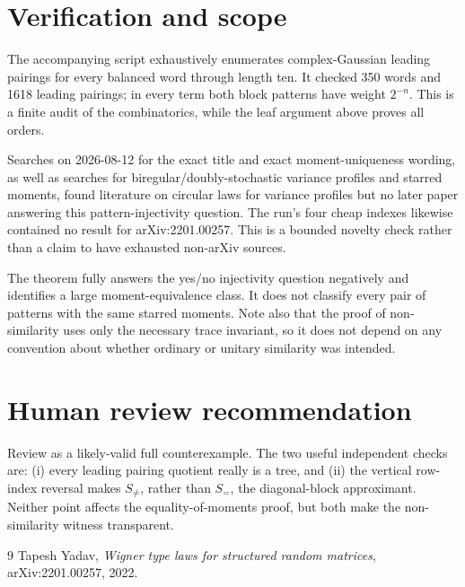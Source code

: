\documentclass[11pt]{article}
\newcommand{\1}{\mathbf 1}
\begin{document}
\section*{Verification and scope}

The accompanying script exhaustively enumerates complex-Gaussian leading
pairings for every balanced word through length ten.  It checked 350 words
and 1618 leading pairings; in every term both block patterns have weight
$2^{-n}$.  This is a finite audit of the combinatorics, while the leaf
argument above proves all orders.

Searches on 2026-08-12 for the exact title and exact moment-uniqueness wording,
as well as searches for biregular/doubly-stochastic variance profiles and
starred moments, found literature on circular laws for variance profiles but
no later paper answering this pattern-injectivity question.  The run's four
cheap indexes likewise contained no result for arXiv:2201.00257.  This is a
bounded novelty check rather than a claim to have exhausted non-arXiv sources.

The theorem fully answers the yes/no injectivity question negatively and
identifies a large moment-equivalence class.  It does not classify every pair
of patterns with the same starred moments.  Note also that the proof of
non-similarity uses only the necessary trace invariant, so it does not depend
on any convention about whether ordinary or unitary similarity was intended.

\section*{Human review recommendation}

Review as a likely-valid full counterexample.  The two useful independent
checks are: (i) every leading pairing quotient really is a tree, and (ii) the
vertical row-index reversal makes $S_{\ne}$, rather than $S_=$, the
diagonal-block approximant.  Neither point affects the equality-of-moments
proof, but both make the non-similarity witness transparent.

\begin{thebibliography}{9}
Tapesh Yadav,
\emph{Wigner type laws for structured random matrices},
arXiv:2201.00257, 2022.
\end{thebibliography}
\end{document}

